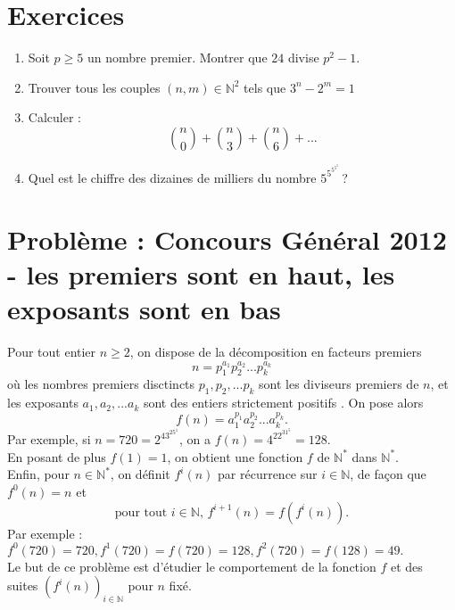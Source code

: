 \documentclass[10pt,a4paper]{article}
\begin{document}
\section{Exercices}

\begin{enumerate}
\bigskip
\item Soit $p\geqslant 5$ un nombre premier. Montrer que $24$ divise $p^2-1$.
\bigskip
\item
Trouver tous les couples $(n,m)\in\mathbb{N}^2$ tels que $3^n-2^m=1$
\bigskip
\item
Calculer :
$$\binom{n}{0}+\binom{n}{3}+\binom{n}{6}+...$$
\bigskip
\item
Quel est le chiffre des dizaines de milliers du nombre $5^{5^{5^{5^{5}}}}$\,?
\end{enumerate}
\section{Problème : Concours Général 2012 - les premiers sont en haut, les exposants sont en bas}
\noindent
Pour tout entier $n\geqslant 2$, on dispose de la décomposition en facteurs premiers
$$n=p_1^{a_1}p_2^{a_2}...p_k^{a_k}$$
où les nombres premiers disctincts $p_1,p_2,...p_k$ sont les diviseurs premiers de $n$, et les exposants $a_1,a_2,...a_k$ sont des entiers strictement positifs
. On pose alors 
$$f(n)=a_1^{p_1}a_2^{p_2}...a_k^{p_k}.$$
Par exemple, si $n=720=2^43^25^1$, on a $f(n)=4^22^31^5=128$.
\\
En posant de plus $f(1)=1$, on obtient une fonction $f$ de $\mathbb{N}^*$ dans $\mathbb{N}^*$.
\\
Enfin, pour $n\in\mathbb{N}^*$, on définit $f^i(n)$ par récurrence sur $i\in\mathbb{N}$, de façon que $f^0(n)=n$ et
$$\text{pour tout $i\in\mathbb{N}$, } f^{i+1}(n)=f(f^i(n)).$$
Par exemple : $f^0(720)=720, f^1(720)=f(720)=128, f^2(720)=f(128)=49.$
\\
Le but de ce problème est d'étudier le comportement de la fonction $f$ et des suites $(f^i(n))_{i\in\mathbb{N}}$ pour $n$ fixé.
\end{document}
